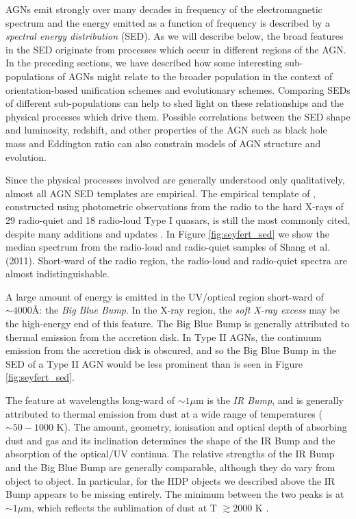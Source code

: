 AGNs emit strongly over many decades in frequency of the electromagnetic spectrum and the energy emitted as a function of frequency is described by a {\it spectral energy distribution} (SED). As we will describe below, the broad features in the SED originate from processes which occur in different regions of the AGN. In the preceding sections, we have described how some interesting sub-populations of AGNs might relate to the broader population in the context of orientation-based unification schemes and evolutionary schemes. Comparing SEDs of different sub-populations can help to shed light on these relationships and the physical processes which drive them. Possible correlations between the SED shape and luminosity, redshift, and other properties of the AGN such as black hole mass and Eddington ratio can also constrain models of AGN structure and evolution. 

Since the physical processes involved are generally understood only qualitatively, almost all AGN SED templates are empirical. The empirical template of \citet{elvis94}, constructed using photometric observations from the radio to the hard X-rays of 29 radio-quiet and 18 radio-loud Type I quasars, is still the most commonly cited, despite many additions and updates \citep[e.g.][]{polletta00, kuraszkiewicz03, risaliti04, richards06,  polletta07, lusso10, shang11, marchese12, trichas12}. In Figure \ref{fig:seyfert_sed} we show the median spectrum from the radio-loud and radio-quiet samples of Shang et al. (2011). Short-ward of the radio region, the radio-loud and radio-quiet spectra are almost indistinguishable. 

A large amount of energy is emitted in the UV/optical region short-ward of $\sim4000$\AA: the {\it Big Blue Bump}. In the X-ray region, the {\it soft X-ray excess} may be the high-energy end of this feature. The Big Blue Bump is generally attributed to thermal emission from the accretion disk. In Type II AGNs, the continuum emission from the accretion disk is obscured, and so the Big Blue Bump in the SED of a Type II AGN would be less prominent than is seen in Figure \ref{fig:seyfert_sed}. 

The feature at wavelengths long-ward of $\sim1\mu$m is the {\it IR Bump}, and is generally attributed  to thermal emission from dust at a wide range of temperatures ($\sim50 - 1000$ K). The amount, geometry, ionisation and optical depth of absorbing dust and gas and its inclination determines the shape of the IR Bump and the absorption of the optical/UV continua. The relative strengths of the IR Bump and the Big Blue Bump are generally comparable, although they do vary from object to object. In particular, for the HDP objects we described above the IR Bump appears to be missing entirely. The minimum between the two peaks is at $\sim1\mu$m, which reflects the sublimation of dust at T $\gtrsim 2000$ K \citep{sanders89}.

